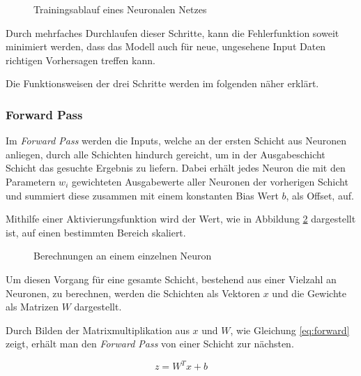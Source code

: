 \vspace{1cm}
\begin{figure}[H]
    \centering
    
    \caption{Trainingsablauf eines Neuronalen Netzes}
    \label{fig:train}
\end{figure}
\vspace{1cm}


Durch mehrfaches Durchlaufen dieser Schritte, 
kann die Fehlerfunktion soweit minimiert werden, dass 
das Modell auch für neue, ungesehene Input Daten 
richtigen Vorhersagen treffen kann.

Die Funktionsweisen der drei Schritte 
werden im folgenden näher erklärt.

\subsubsection{Forward Pass}
Im \textit{Forward Pass} werden die Inputs, welche an der 
ersten Schicht aus Neuronen anliegen, durch alle Schichten hindurch 
gereicht, um in der Ausgabeschicht Schicht
das gesuchte Ergebnis zu liefern.
Dabei erhält jedes Neuron die mit den Parametern $w_{i}$ gewichteten
Ausgabewerte aller Neuronen der vorherigen Schicht und summiert diese
zusammen mit einem konstanten Bias Wert $b$, als Offset, auf.

Mithilfe einer Aktivierungsfunktion wird der Wert, wie 
in Abbildung \ref{fig:neuron} dargestellt ist, auf
einen bestimmten Bereich skaliert.


\vspace{1cm}
\begin{figure}[H]
    \centering
    
    \caption{Berechnungen an einem einzelnen Neuron}
    \label{fig:neuron}
\end{figure}
\vspace{1cm}

Um diesen Vorgang für eine gesamte Schicht, bestehend aus 
einer Vielzahl an Neuronen, zu berechnen, werden die Schichten 
als Vektoren $x$ und die Gewichte als Matrizen $W$ dargestellt.

Durch Bilden der Matrixmultiplikation aus $x$ und $W$, wie Gleichung 
\ref{eq:forward} zeigt,
erhält man den \textit{Forward Pass} von einer Schicht zur nächsten.

\vspace{0.5cm}
\begin{equation}
    \label{eq:forward}
    z = W^{T}x+b
\end{equation}
\vspace{0.5cm}

